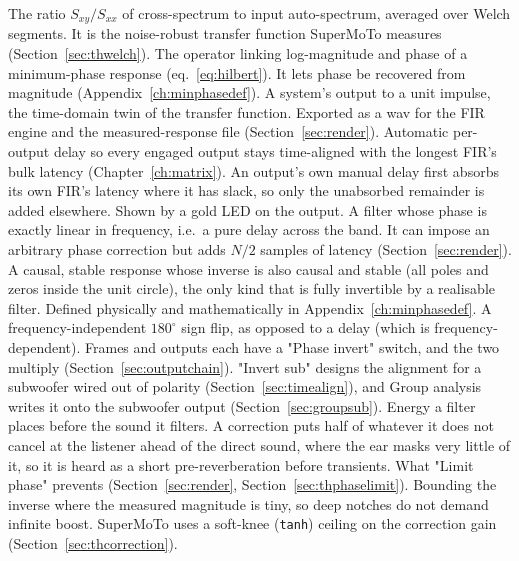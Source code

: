 \begin{description}[style=nextline, leftmargin=0pt, font=\normalfont\bfseries]
   The ratio $S_{xy}/S_{xx}$ of cross-spectrum to input auto-spectrum, averaged over Welch segments. It is the noise-robust transfer function SuperMoTo measures (Section~\ref{sec:thwelch}).
   The operator linking log-magnitude and phase of a minimum-phase response (eq.~\eqref{eq:hilbert}). It lets phase be recovered from magnitude (Appendix~\ref{ch:minphasedef}).
   A system's output to a unit impulse, the time-domain twin of the transfer function. Exported as a wav for the FIR engine and the measured-response file (Section~\ref{sec:render}).
   Automatic per-output delay so every engaged output stays time-aligned with the longest FIR's bulk latency (Chapter~\ref{ch:matrix}). An output's own manual delay first absorbs its own FIR's latency where it has slack, so only the unabsorbed remainder is added elsewhere. Shown by a gold LED on the output.
   A filter whose phase is exactly linear in frequency, i.e.\ a pure delay across the band. It can impose an arbitrary phase correction but adds $N/2$ samples of latency (Section~\ref{sec:render}).
   A causal, stable response whose inverse is also causal and stable (all poles and zeros inside the unit circle), the only kind that is fully invertible by a realisable filter. Defined physically and mathematically in Appendix~\ref{ch:minphasedef}.
   A frequency-independent $180^\circ$ sign flip, as opposed to a delay (which is frequency-dependent). Frames and outputs each have a "Phase invert" switch, and the two multiply (Section~\ref{sec:outputchain}). "Invert sub" designs the alignment for a subwoofer wired out of polarity (Section~\ref{sec:timealign}), and Group analysis writes it onto the subwoofer output (Section~\ref{sec:groupsub}).
   Energy a filter places before the sound it filters. A  correction puts half of whatever it does not cancel at the listener ahead of the direct sound, where the ear masks very little of it, so it is heard as a short pre-reverberation before transients. What "Limit phase" prevents (Section~\ref{sec:render}, Section~\ref{sec:thphaselimit}).
   Bounding the inverse where the measured magnitude is tiny, so deep notches do not demand infinite boost. SuperMoTo uses a soft-knee (\texttt{tanh}) ceiling on the correction gain (Section~\ref{sec:thcorrection}).

\end{description}
